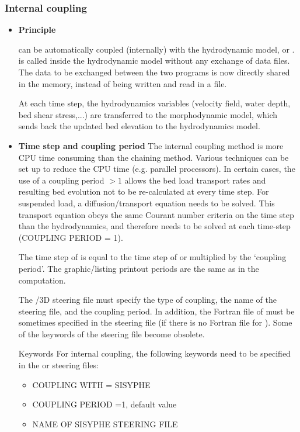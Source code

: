 \subsubsection{Internal coupling}
\begin{itemize}
\item \textbf{Principle}

\sisyphe can be automatically coupled
(internally) with the hydrodynamic model, \teldd or \telddd. \sisyphe is
called inside the hydrodynamic model without any exchange of data files. The
data to be exchanged between the two programs is now directly shared in the
memory, instead of being written and read in a file. %

At each time step, the hydrodynamics variables (velocity field, water depth,
bed shear stress,...) are transferred to the morphodynamic model, which
sends back the updated bed elevation to the hydrodynamics model.
\\

\item \textbf{Time step and coupling period}
The internal coupling method is more CPU time consuming than the chaining
method. Various techniques can be set up to reduce the CPU time (e.g.
parallel processors). 
In certain cases, the use of a coupling
period $>1$ allows the bed load transport rates and resulting bed
evolution not to be re-calculated at every time step.
For suspended load, a diffusion/transport equation needs to be solved.
This transport equation obeys the same Courant number criteria on the time
step than the hydrodynamics, and therefore needs to be solved at each
time-step ({\ttfamily COUPLING PERIOD = 1}).

The time step of \sisyphe is equal to the time step of \teldd or \telddd
multiplied by the `coupling period'. The graphic/listing printout periods
are the same as in the \tel computation.

The \teldd/3D steering file must specify the type of coupling, the name
of the \sisyphe steering file, and the coupling period. In addition, the
Fortran file of \sisyphe must be sometimes specified in the \tel steering
file (if there is no Fortran file for \tel). Some of the keywords of the
\sisyphe steering file become obsolete.

\medskip
\begin{bclogo}[couleur=blue!10,arrondi=0.1, logo=\bcinfo]{Keywords}
For internal coupling, the following keywords need to be specified in the
\teldd or \telddd steering files:
\begin{itemize}
\item {\ttfamily COUPLING WITH = SISYPHE} 
\item {\ttfamily COUPLING PERIOD =1}, default value 
\item {\ttfamily NAME OF SISYPHE STEERING FILE}
\end{itemize}
\end{bclogo}


\end{itemize}
